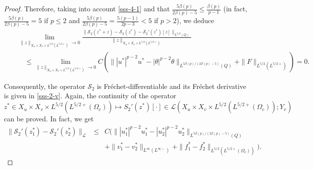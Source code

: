 \documentclass[11pt,reqno]{amsart}%
\numberwithin{equation}{section}
\begin{document}
{\begin{proof}

Therefore,  taking into account \eqref{sss-4-1}  and that $\frac{5\beta(p)}{2\beta(p)-5}\le \frac{\beta(p)}{p-1}$
(in fact, $\frac{5\beta(p)}{2\beta(p)-5}=5$ if $p\le2$ and $\frac{5\beta(p)}{2\beta(p)-5}=\frac{5(p-1)}{2p-3}<5$ if $p>2$),
we deduce
\begin{eqnarray*}
&&\lim_{\|z \|_{{X}_{ u}\times{X}_{v}
\times L^{5/2}(L^{5/2+})} \to 0}
\frac{\|\mathcal{S}_2(z^*+z)-\mathcal{S}_2(z^*)-\mathcal{S}_2'(z^*)[z]\|_{L^{ 5/2}(Q)}}
{\|z \|_{{X}_{u}\times{X}_{v} \times L^{5/2}(L^{5/2+})}}\\
&&
\quad \le \lim_{\| z \|_{{X}_{u}\times{X}_{v} \times L^{5/2}(L^{5/2+})} \to0}
C \left( \| |u^*|^{p-2} u^* -|\theta|^{p-2}\theta\|_{L^{5\beta(p)/(2\beta(p)-5)}(Q)} +  \| F \|_{L^{5/2}(L^{5/2+})} \right)=0.
\end{eqnarray*}


Consequently, the operator $\mathcal{S}_2$ is Fr\'echet-differentiable and its Fr\'echet derivative is given in 
\eqref{sss-2-v}. Again, the continuity of the operator 
$$z^*\in X_u\times X_v\times L^{5/2}(L^{5/2+}(\Omega_c)) \longmapsto S_2'(z^*)[\cdot]\in  \mathcal{L}(X_u\times X_v\times L^{5/2}(L^{5/2+}(\Omega_c)); Y_v)
$$
 can be proved. In fact, we get 
\begin{eqnarray*}
\| \mathcal{S}_2'(z_1^*) - \mathcal{S}_2'(z_2^*)\|_{\mathcal{L}} %
 &\le& C( \| |u_1^*|^{p-2}u_1^*-|u_2^*|^{p-2}u_2^* \|_{L ^{5\beta(p)/(2\beta(p)-5)}(Q)} \\
 &&+ \| v_1^*-v_2^* \|_{L^{\infty}(L^{\infty-})} + \| f_1^*-f_2^* \|_{L^{5/2}(L^{5/2+}(\Omega_c))}).
\end{eqnarray*}
%
\end{proof}
%
}
\end{document}
